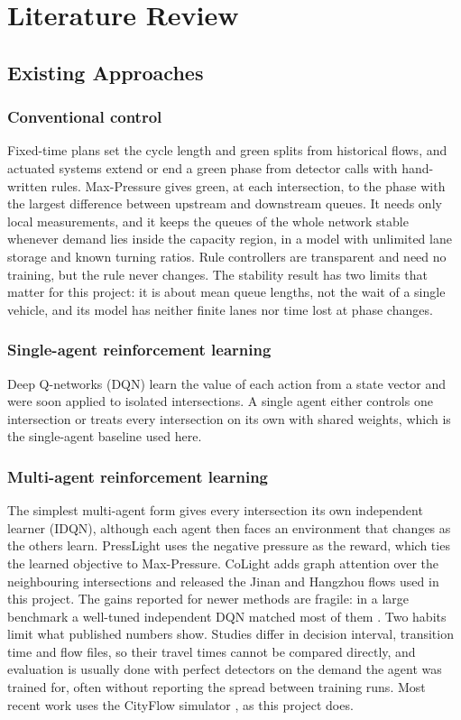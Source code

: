 \chapter{Literature Review}
\label{ch:literature}

\section{Existing Approaches}

\subsection{Conventional control}
Fixed-time plans set the cycle length and green splits from historical flows, and actuated
systems extend or end a green phase from detector calls with hand-written rules.
Max-Pressure \citep{varaiya2013max} gives green, at each intersection, to the phase with the
largest difference between upstream and downstream queues. It needs only local measurements,
and it keeps the queues of the whole network stable whenever demand lies inside the capacity
region, in a model with unlimited lane storage and known turning ratios. Rule controllers
are transparent and need no training, but the rule never changes. The stability result has
two limits that matter for this project: it is about mean queue lengths, not the wait of a
single vehicle, and its model has neither finite lanes nor time lost at phase changes.

\subsection{Single-agent reinforcement learning}
Deep Q-networks (DQN) \citep{mnih2015human} learn the value of each action from a state
vector and were soon applied to isolated intersections. A single agent either controls one
intersection or treats every intersection on its own with shared weights, which is the
single-agent baseline used here.

\subsection{Multi-agent reinforcement learning}
The simplest multi-agent form gives every intersection its own independent learner (IDQN),
although each agent then faces an environment that changes as the others learn. PressLight
\citep{wei2019presslight} uses the negative pressure as the reward, which ties the learned
objective to Max-Pressure. CoLight \citep{wei2019colight} adds graph attention over the
neighbouring intersections and released the Jinan and Hangzhou flows used in this project.
The gains reported for newer methods are fragile: in a large benchmark a well-tuned
independent DQN matched most of them \citep{ault2021reinforcement}. Two habits limit what
published numbers show. Studies differ in decision interval, transition time and flow files,
so their travel times cannot be compared directly, and evaluation is usually done with perfect
detectors on the demand the agent was trained for, often without reporting the spread
between training runs. Most recent work uses the CityFlow simulator
\citep{zhang2019cityflow}, as this project does.

